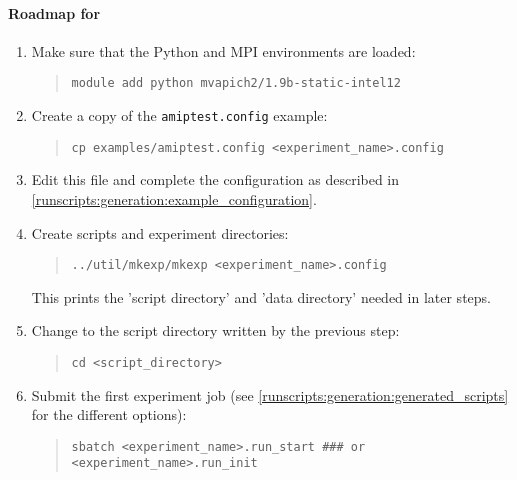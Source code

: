 \paragraph*{Roadmap for \thunder}
\label{runscripts:generation:thunder}

\begin{enumerate}

\item

Make sure that the Python and MPI environments are loaded:
\begin{quote}
\begin{verbatim}
module add python mvapich2/1.9b-static-intel12
\end{verbatim}
\end{quote}

\item

Create a copy of the \texttt{amiptest.config} example:
%
\begin{quote}
\begin{verbatim}
cp examples/amiptest.config <experiment_name>.config
\end{verbatim}
\end{quote}

\item

Edit this file and complete the configuration as described in
\ref{runscripts:generation:example_configuration}.

\item

Create scripts and experiment directories:
\begin{quote}
\begin{verbatim}
../util/mkexp/mkexp <experiment_name>.config
\end{verbatim}
\end{quote}
This prints the 'script directory' and 'data directory' needed in later steps.

\item

Change to the script directory written by the previous step:
\begin{quote}
\begin{verbatim}
cd <script_directory>
\end{verbatim}
\end{quote}

\item

Submit the first experiment job (see
\ref{runscripts:generation:generated_scripts} for the different options):
%
\begin{quote}
\begin{verbatim}
sbatch <experiment_name>.run_start ### or <experiment_name>.run_init
\end{verbatim}
\end{quote}


\end{enumerate}
